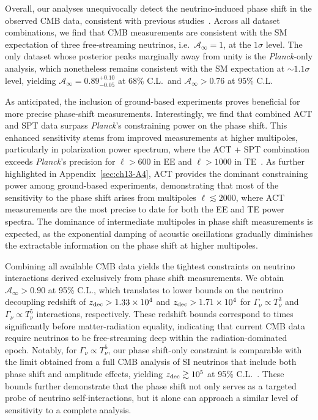 Overall, our analyses unequivocally detect the neutrino-induced phase shift in the observed CMB data, consistent with previous studies~\cite{Follin:2015hya,Baumann:2015rya, Brust:2017nmv, Choi:2018gho,Kreisch:2019yzn, Forastieri:2019cuf, Blinov:2020hmc, Das:2020xke, Brinckmann:2020bcn, Saravanan:2025cyi, Montefalcone:2025unv}. Across all dataset combinations, we find that CMB measurements are consistent with the SM expectation of three free-streaming neutrinos, i.e.\ $\mathcal{A}_\infty = 1$, at the $1\sigma$ level. The only dataset whose posterior peaks marginally away from unity is the \textit{Planck}-only analysis, which nonetheless remains consistent with the SM expectation at $\sim 1.1\sigma$ level, yielding $\mathcal{A}_\infty = 0.89^{+0.10}_{-0.05}$ at 68\% C.L.\ and $\mathcal{A}_\infty > 0.76$ at 95\% C.L.

As anticipated, the inclusion of ground-based experiments proves beneficial for more precise phase-shift measurements. Interestingly, we find that combined ACT and SPT data surpass \textit{Planck}'s constraining power on the phase shift. This enhanced sensitivity stems from improved measurements at higher multipoles, particularly in polarization power spectrum, where the ACT + SPT combination exceeds \textit{Planck}'s precision for $\ell > 600$ in EE and $\ell > 1000$ in TE~\cite{ACT:2025fju,SPT-3G:2025bzu}.  As further highlighted in Appendix~\ref{sec:ch13-A4}, ACT provides the dominant constraining power among ground-based experiments, demonstrating that most of the sensitivity to the phase shift arises from multipoles $\ell\lesssim 2000$, where ACT measurements are the most precise to date for both the EE and TE power spectra.  The dominance of intermediate multipoles in phase shift measurements is expected, as the exponential damping of acoustic oscillations gradually diminishes the extractable information on the phase shift at higher multipoles.

Combining all available CMB data yields the tightest constraints on neutrino interactions derived exclusively from phase shift measurements. We obtain $\mathcal{A}_\infty > 0.90$ at 95\% C.L., which translates to lower bounds on the neutrino decoupling redshift of $z_{\rm dec} > 1.33 \times 10^4$ and $z_{\rm dec} > 1.71 \times 10^4$ for $\Gamma_\nu \propto T_\nu^3$ and $\Gamma_\nu \propto T_\nu^5$ interactions, respectively. These redshift bounds correspond to times significantly before matter-radiation equality, indicating that current CMB data require neutrinos to be free-streaming deep within the radiation-dominated epoch. Notably, for $\Gamma_\nu \propto T_\nu^5$, our phase shift-only constraint is comparable with the limit obtained from a full CMB analysis of SI neutrinos that include both phase shift and amplitude effects, yielding $z_{\rm dec} \gtrsim 10^5$ at 95\% C.L.~\cite{RoyChoudhury:2020dmd,Poudou:2025qcx}. These bounds further demonstrate that the phase shift not only serves as a targeted probe of neutrino self-interactions, but it alone can approach a similar level of sensitivity to a complete analysis.



